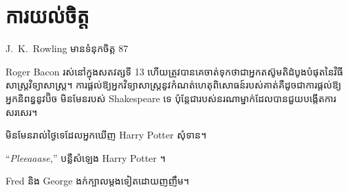 \chapter{ការយល់ចិត្ត}

\begin{chapterOpeningAuthorNote}
J.~K.~Rowling មានទំនុកចិត្ត 87%

Roger Bacon រស់នៅក្នុងសតវត្សទី 13 ហើយត្រូវបានគេចាត់ទុកថាជាអ្នកតស៊ូមតិដំបូងបំផុតនៃវិធីសាស្រ្តវិទ្យាសាស្ត្រ។ ការផ្តល់ឱ្យអ្នកវិទ្យាសាស្ត្រនូវកំណត់ហេតុពិសោធន៍របស់គាត់គឺដូចជាការផ្តល់ឱ្យអ្នកនិពន្ធនូវប៊ិច មិនមែនរបស់ Shakespeare ទេ ប៉ុន្តែជារបស់នរណាម្នាក់ដែលបានជួយបង្កើតការសរសេរ។
\end{chapterOpeningAuthorNote}

 មិនមែនរាល់ថ្ងៃទេដែលអ្នកឃើញ Harry Potter សុំទាន។

\hplettrineextrapara
“\emph{Pleeaaase,}” បន្លឺសំឡេង Harry Potter ។

Fred និង George ងក់ក្បាលម្តងទៀតដោយញញឹម។


